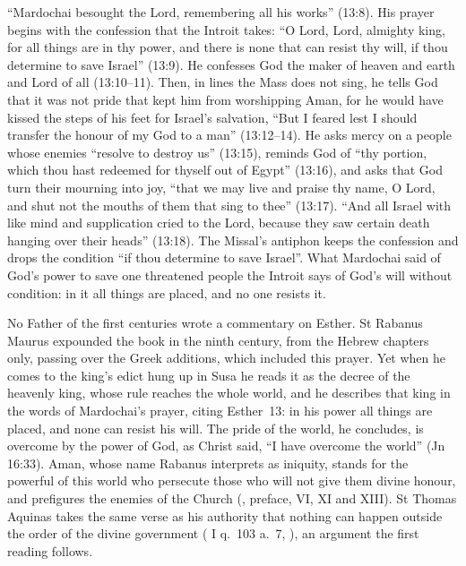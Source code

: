 ``Mardochai besought the Lord, remembering all his works'' (13:8). His prayer
begins with the confession that the Introit takes: ``O Lord, Lord, almighty
king, for all things are in thy power, and there is none that can resist thy
will, if thou determine to save Israel'' (13:9). He confesses God the maker of
heaven and earth and Lord of all (13:10--11). Then, in lines the Mass does not
sing, he tells God that it was not pride that kept him from worshipping Aman,
for he would have kissed the steps of his feet for Israel's salvation, ``But I
feared lest I should transfer the honour of my God to a man'' (13:12--14). He
asks mercy on a people whose enemies ``resolve to destroy us'' (13:15), reminds
God of ``thy portion, which thou hast redeemed for thyself out of Egypt''
(13:16), and asks that God turn their mourning into joy, ``that we may live and
praise thy name, O Lord, and shut not the mouths of them that sing to thee''
(13:17). ``And all Israel with like mind and supplication cried to the Lord,
because they saw certain death hanging over their heads'' (13:18). The Missal's
antiphon keeps the confession and drops the condition ``if thou determine to
save Israel''. What Mardochai said of God's power to save one threatened people
the Introit says of God's will without condition: in it all things are placed,
and no one resists it.

No Father of the first centuries wrote a commentary on Esther. St Rabanus Maurus
expounded the book in the ninth century, from the Hebrew chapters only, passing
over the Greek additions, which included this prayer. Yet when he comes to the
king's edict hung up in Susa he reads it as the decree of the heavenly king,
whose rule reaches the whole world, and he describes that king in the words of
Mardochai's prayer, citing Esther~13: in his power all things are placed, and
none can resist his will. The pride of the world, he concludes, is overcome by
the power of God, as Christ said, ``I have overcome the world'' (Jn 16:33). Aman, whose name
Rabanus interprets as iniquity, stands for the powerful of this world who
persecute those who will not give them divine honour, and prefigures the enemies
of the Church (, preface, VI, XI and XIII). St
Thomas Aquinas takes the same verse as his authority that nothing can happen
outside the order of the divine government ( I q.~103
a.~7, ), an argument the first reading follows.

